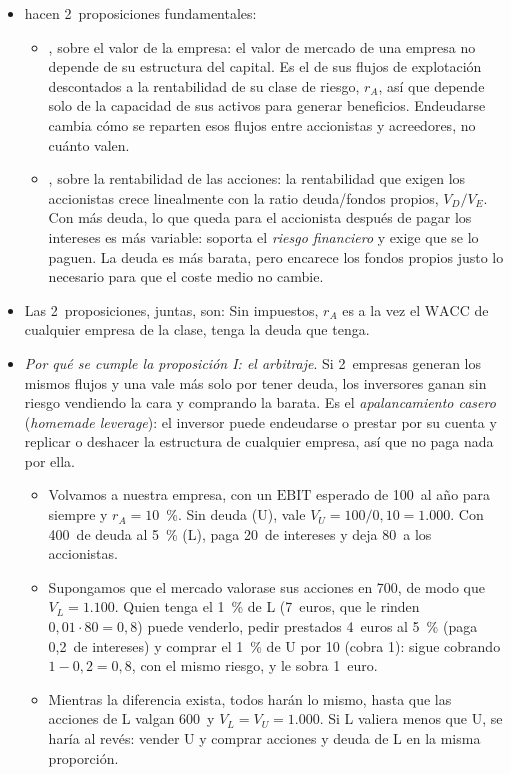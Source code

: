 \documentclass[11pt]{article}
\begin{document}
\begin{itemize}
\item \textcite{ModiglianiMiller1958Cost} hacen 2~proposiciones fundamentales:
  \begin{itemize}
  \item {}, sobre el valor de la empresa: el valor de mercado de una empresa no depende de su estructura del capital. Es el de sus flujos de explotación descontados a la rentabilidad de su clase de riesgo, $r_A$, así que depende solo de la capacidad de sus activos para generar beneficios. Endeudarse cambia cómo se reparten esos flujos entre accionistas y acreedores, no cuánto valen.
  \item {}, sobre la rentabilidad de las acciones: la rentabilidad que exigen los accionistas crece linealmente con la ratio deuda/fondos propios, $V_D/V_E$. Con más deuda, lo que queda para el accionista después de pagar los intereses es más variable: soporta el \emph{riesgo financiero} y exige que se lo paguen. La deuda es más barata, pero encarece los fondos propios justo lo necesario para que el coste medio no cambie.
  \end{itemize}
\item Las 2~proposiciones, juntas, son:
  Sin impuestos, $r_A$ es a la vez el $\mathrm{WACC}$ de cualquier empresa de la clase, tenga la deuda que tenga.
\item \emph{Por qué se cumple la proposición I: el arbitraje}. Si 2~empresas generan los mismos flujos y una vale más solo por tener deuda, los inversores ganan sin riesgo vendiendo la cara y comprando la barata. Es el \emph{apalancamiento casero} (\emph{homemade leverage}): el inversor puede endeudarse o prestar por su cuenta y replicar o deshacer la estructura de cualquier empresa, así que no paga nada por ella.
  \begin{itemize}
  \item Volvamos a nuestra empresa, con un $\mathrm{EBIT}$ esperado de 100~al año para siempre y $r_A=10$~\%. Sin deuda (U), vale $V_U=100/0{,}10=1.000$. Con 400~de deuda al 5~\% (L), paga 20~de intereses y deja 80~a los accionistas.
  \item Supongamos que el mercado valorase sus acciones en 700, de modo que $V_L=1.100$. Quien tenga el 1~\% de L (7~euros, que le rinden $0{,}01\cdot80=0{,}8$) puede venderlo, pedir prestados 4~euros al 5~\% (paga 0,2~de intereses) y comprar el 1~\% de U por 10 (cobra 1): sigue cobrando $1-0{,}2=0{,}8$, con el mismo riesgo, y le sobra 1~euro.
  \item Mientras la diferencia exista, todos harán lo mismo, hasta que las acciones de L valgan 600~y $V_L=V_U=1.000$. Si L valiera menos que U, se haría al revés: vender U y comprar acciones y deuda de L en la misma proporción.
  \end{itemize}
\end{itemize}
\end{document}
